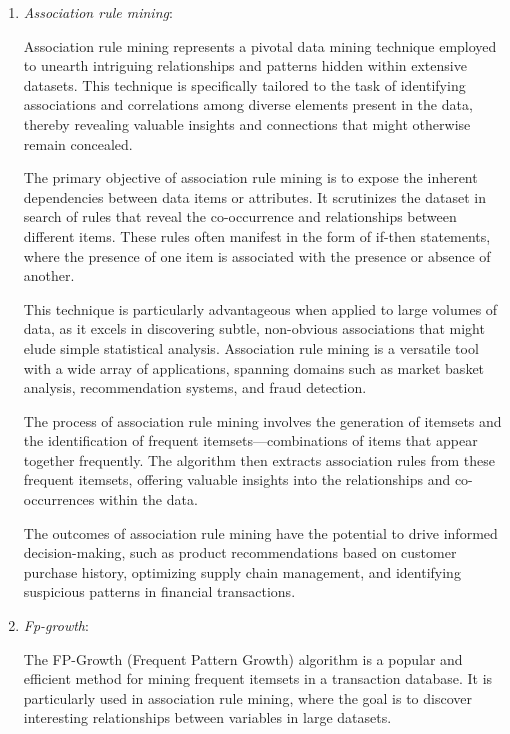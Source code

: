 \begin{enumerate}
    
    \item \emph{Association rule mining}:

        Association rule mining represents a pivotal data mining technique employed to unearth intriguing relationships and patterns hidden within extensive datasets. This technique is specifically tailored to the task of identifying associations and correlations among diverse elements present in the data, thereby revealing valuable insights and connections that might otherwise remain concealed. 

        The primary objective of association rule mining is to expose the inherent dependencies between data items or attributes. It scrutinizes the dataset in search of rules that reveal the co-occurrence and relationships between different items. These rules often manifest in the form of if-then statements, where the presence of one item is associated with the presence or absence of another. 

        This technique is particularly advantageous when applied to large volumes of data, as it excels in discovering subtle, non-obvious associations that might elude simple statistical analysis. Association rule mining is a versatile tool with a wide array of applications, spanning domains such as market basket analysis, recommendation systems, and fraud detection. 

        The process of association rule mining involves the generation of itemsets and the identification of frequent itemsets—combinations of items that appear together frequently. The algorithm then extracts association rules from these frequent itemsets, offering valuable insights into the relationships and co-occurrences within the data. 

        The outcomes of association rule mining have the potential to drive informed decision-making, such as product recommendations based on customer purchase history, optimizing supply chain management, and identifying suspicious patterns in financial transactions.

    \item \emph{Fp-growth}:
    
        The FP-Growth (Frequent Pattern Growth) algorithm is a popular and efficient method for mining frequent itemsets in a transaction database. It is particularly used in association rule mining, where the goal is to discover interesting relationships between variables in large datasets.


\end{enumerate}
